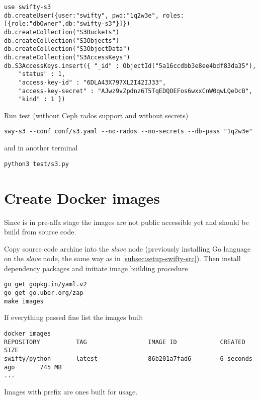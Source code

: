 \begin{lstlisting}
use swifty-s3
db.createUser({user:"swifty", pwd:"1q2w3e", roles:[{role:"dbOwner",db:"swifty-s3"}]})
db.createCollection("S3Buckets")
db.createCollection("S3Objects")
db.createCollection("S3ObjectData")
db.createCollection("S3AccessKeys")
db.S3AccessKeys.insert({ "_id" : ObjectId("5a16ccdbb3e8ee4bdf83da35"),
	"status" : 1,
	"access-key-id" : "6DLA43X797XL2I42IJ33",
	"access-key-secret" : "AJwz9vZpdnz6T5TqEDQOEFos6wxxCnW0qwLQeDcB",
	"kind" : 1 })
\end{lstlisting}

Run test (without Ceph rados support and without secrets)

\begin{lstlisting}
swy-s3 --conf conf/s3.yaml --no-rados --no-secrets --db-pass "1q2w3e"
\end{lstlisting}

and in another terminal

\begin{lstlisting}
python3 test/s3.py
\end{lstlisting}

\section{Create Docker images}
\label{sec:setup-images}

Since  is in pre-alfa stage the images are not public
accessible yet and should be build from  source code.

Copy source code archine into the \emph{slave} node (previously
installing Go language on the \emph{slave} node, the same way
as in \ref{subsec:setup-swifty-src}). Then install dependency packages
and initiate image building procedure

\begin{lstlisting}
go get gopkg.in/yaml.v2
go get go.uber.org/zap
make images
\end{lstlisting}

If everything passed fine list the images built

\begin{lstlisting}
docker images
REPOSITORY          TAG                 IMAGE ID            CREATED             SIZE
swifty/python       latest              86b201a7fad6        6 seconds ago       745 MB
...
\end{lstlisting}

Images with  prefix are ones built for  usage.

